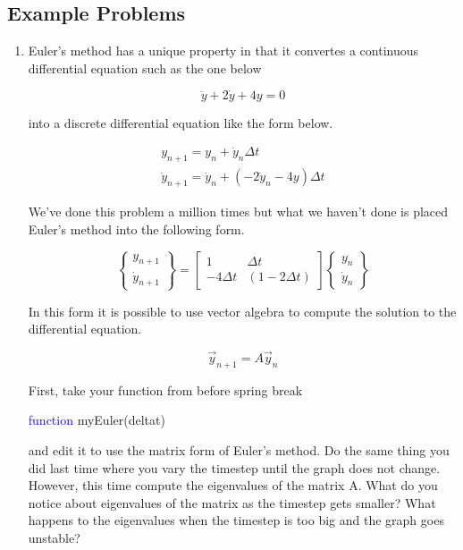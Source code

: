 \subsection{Example Problems}

\begin{enumerate}

\item Euler's method has a unique property in that it convertes a
  continuous differential equation such as the one below 

\begin{equation}
\ddot{y} + 2\dot{y} + 4y = 0
\end{equation}

into a discrete differential equation like the form below.

\begin{equation}
\begin{matrix}
{y}_{n+1} = {y}_n + \dot{y}_n\Delta t \\
\dot{y}_{n+1} = \dot{y}_n + (-2\dot{y}_n - 4y)\Delta t
\end{matrix}
\end{equation}

We've done this problem a
million times but what we haven't done is placed Euler's method into
the following form. 

\begin{equation}
\begin{Bmatrix}
y_{n+1} \\ \dot{y}_{n+1} \end{Bmatrix} = \begin{bmatrix} 1 & \Delta t
  \\ -4\Delta t & (1-2\Delta t) \end{bmatrix} \begin{Bmatrix} y_{n}
  \\ \dot{y}_n \end{Bmatrix}
\end{equation}

In this form it is possible to use vector algebra to compute the
solution to the differential equation. 

\begin{equation}
\vec{y}_{n+1} = A\vec{y}_n
\end{equation}

First, take your function from before spring break

\textcolor{blue}{function} myEuler(deltat)

and edit it to use the matrix form of Euler's method. Do the same
thing you did last time where you vary the timestep until the graph
does not change. However, this time compute the eigenvalues of the
matrix A. What do you notice about eigenvalues of the matrix as the
timestep gets smaller? What happens to the eigenvalues when the
timestep is too big and the graph goes unstable?


\end{enumerate}

